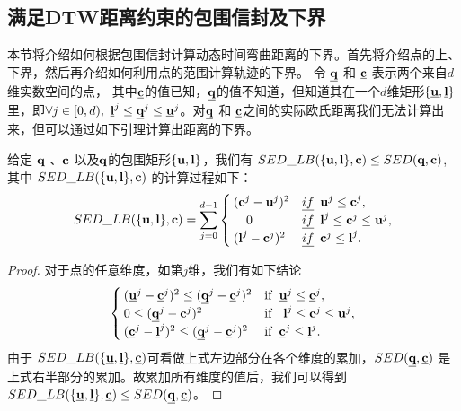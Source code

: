 \subsection{满足DTW距离约束的包围信封及下界} \label{sec-c5-lowerBound}
本节将介绍如何根据包围信封计算动态时间弯曲距离的下界。首先将介绍点的上、下界，然后再介绍如何利用点的范围计算轨迹的下界。
令 $\vq$ 和 $\vc$ 表示两个来自$d$维实数空间的点， 其中$\vc$的值已知，$\vq$的值不知道，但知道其在一个$d$维矩形$\{\vu, \vl\}$里，即$\forall j\in [0, d),  \,\, {\vl}^{j}  \le \vq^{j} \le \vu^{j}$。对$\vq$ 和 $\vc$之间的实际欧氏距离我们无法计算出来，但可以通过如下引理计算出距离的下界。
\begin{lemma}\label{theory:SEDLB}
	给定 $\bq$ 、$\bc$ 以及$\bq$的包围矩形$\{\bu, \bl\}$，我们有
	$SED\_LB(\{{\bu},\bl \},\bc)\le SED(\bq,\bc)$, 其中 $SED\_LB(\{{\bu},\bl \},\bc)$ 的计算过程如下：
	\allowdisplaybreaks
	\begin{equation}
	SED\_LB(\{{\bu},\bl \},\bc) =
	\sum_{j=0}^{d-1} \begin{cases}
	({\bc}^{j}- {\bu}^{j})^2 & \emph{if} \,\,\,   \bu^{j} \le {\bc}^{j},\\
	\quad 0 &   \emph{if} \,\,\,  \bl^{j} \le  {\bc}^{j} \le \bu^{j},\\
	({\bl}^{j} -{\bc}^{j})^2 & \emph{if} \,\,\,    {\bc}^{j} \le \bl^{j}.\\
	\end{cases}
	\end{equation}
	\allowdisplaybreaks[4]
\end{lemma}

\begin{proof}
	对于点的任意维度，如第$j$维，我们有如下结论
	\begin{equation}
	\begin{cases}
	({\vu}^{j}- {\vc}^{j})^2 \le  ({\vq}^{j}- {\vc}^{j})^2     & {\rm if}   \,\,\,    \vu^{j} \le {\vc}^{j},\\
	0 \le  ({\vq}^{j}- {\vc}^{j})^2   & {\rm if}  \,\,\,   \  \vl^{j} \le  {\vc}^{j} \le \vu^{j},\\
	({\vc}^{j} -{\vl}^{j})^2 \le  ({\vq}^{j}- {\vc}^{j})^2  &{\rm if}  \,\,\,    {\vc}^{j} \le \vl^{j}.
	\end{cases}
	\end{equation}
	由于	$SED\_LB(\{{\vu},\vl \},\vc)$可看做上式左边部分在各个维度的累加，$SED(\vq,\vc)$ 是上式右半部分的累加。故累加所有维度的值后，我们可以得到$SED\_LB(\{{\vu},\vl \},\vc)\le SED(\vq,\vc)$。
\end{proof}

